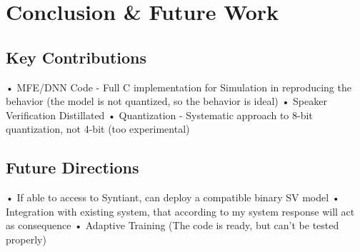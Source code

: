 \chapter{Conclusion \& Future Work}
\label{cha:conclusion}
\section{Key Contributions}
\label{sec:key contributions}
• MFE/DNN Code - Full C implementation for Simulation in reproducing the behavior (the model is not quantized, so the behavior is ideal)\newline 
• Speaker Verification Distillated\newline 
• Quantization - Systematic approach to 8-bit quantization, not 4-bit (too experimental)\newline 

\section{Future Directions}
\label{sec:future directions}
• If able to access to Syntiant, can deploy a compatible binary SV model\newline 
• Integration with existing system, that according to my system response will act as consequence\newline
• Adaptive Training (The code is ready, but can't be tested properly)\newline 

\newpage